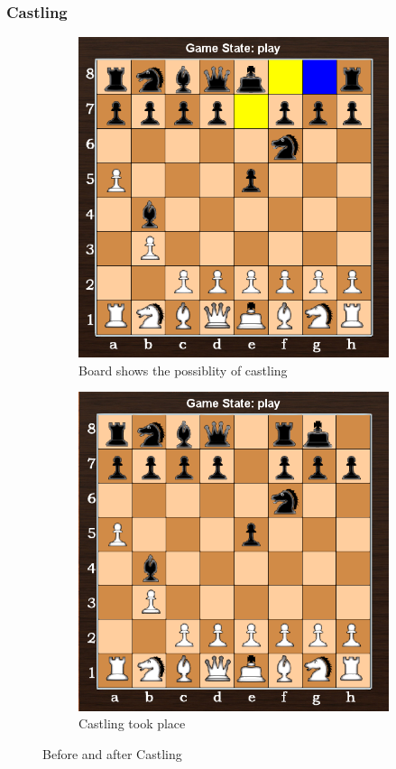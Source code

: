 \documentclass[11pt,a4paper]{article}
\begin{document}
\subsubsection{Castling}
\begin{figure}[H]
\centering
\begin{subfigure}{0.5\textwidth}
  \centering
  \includegraphics[width=0.9\linewidth]{Castling1}
  \caption{Board shows the possiblity of castling}
  \label{fig:sub1}
\end{subfigure}%
\begin{subfigure}{0.5\textwidth}
  \centering
  \includegraphics[width=0.9\linewidth]{Castling2}
  \caption{Castling took place}
  \label{fig:sub2}
\end{subfigure}
\caption{Before and after Castling}
\label{fig:test}
\end{figure}
\end{document}
